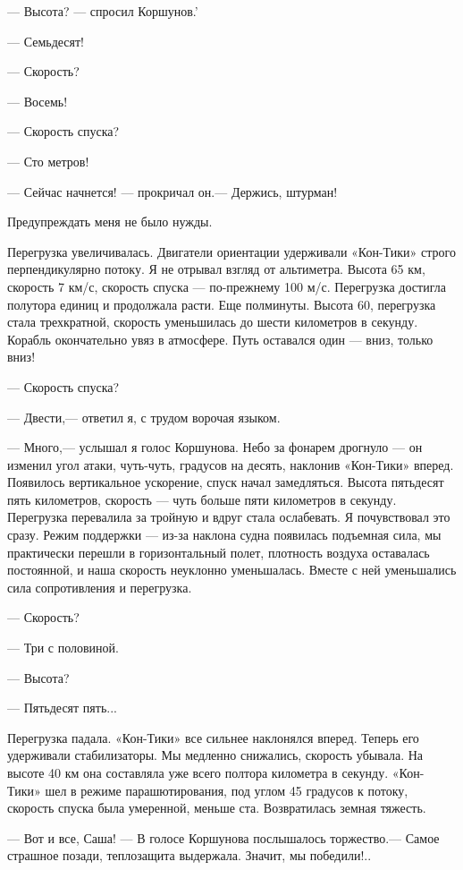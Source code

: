 \documentclass[11pt,a4paper,oneside]{article}
\begin{document}
— Высота? — спросил Коршунов.'

— Семьдесят!

— Скорость?

— Восемь!

— Скорость спуска?

— Сто метров!

— Сейчас начнется! — прокричал он.— Держись, штурман!

Предупреждать меня не было нужды.

Перегрузка увеличивалась. Двигатели ориентации удерживали «Кон-Тики» строго перпендикулярно потоку. Я не отрывал взгляд от альтиметра. Высота 65 км, скорость 7 км/с, скорость спуска — по-прежнему 100 м/с. Перегрузка достигла полутора единиц и продолжала расти. Еще полминуты. Высота 60, перегрузка стала трехкратной, скорость уменьшилась до шести километров в секунду. Корабль окончательно увяз в атмосфере. Путь оставался один — вниз, только вниз!

— Скорость спуска?

— Двести,— ответил я, с трудом ворочая языком.

— Много,— услышал я голос Коршунова. Небо за фонарем дрогнуло — он изменил угол атаки, чуть-чуть, градусов на десять, наклонив «Кон-Тики» вперед. Появилось вертикальное ускорение, спуск начал замедляться. Высота пятьдесят пять километров, скорость — чуть больше пяти километров в секунду. Перегрузка перевалила за тройную и вдруг стала ослабевать. Я почувствовал это сразу. Режим поддержки — из-за наклона судна появилась подъемная сила, мы практически перешли в горизонтальный полет, плотность воздуха оставалась постоянной, и наша скорость неуклонно уменьшалась. Вместе с ней уменьшались сила сопротивления и перегрузка.

— Скорость?

— Три с половиной.

— Высота?

— Пятьдесят пять...

Перегрузка падала. «Кон-Тики» все сильнее наклонялся вперед. Теперь его удерживали стабилизаторы. Мы медленно снижались, скорость убывала. На высоте 40 км она составляла уже всего полтора километра в секунду. «Кон-Тики» шел в режиме парашютирования, под углом 45 градусов к потоку, скорость спуска была умеренной, меньше ста. Возвратилась земная тяжесть.

— Вот и все, Саша! — В голосе Коршунова послышалось торжество.— Самое страшное позади, теплозащита выдержала. Значит, мы победили!..
\end{document}
